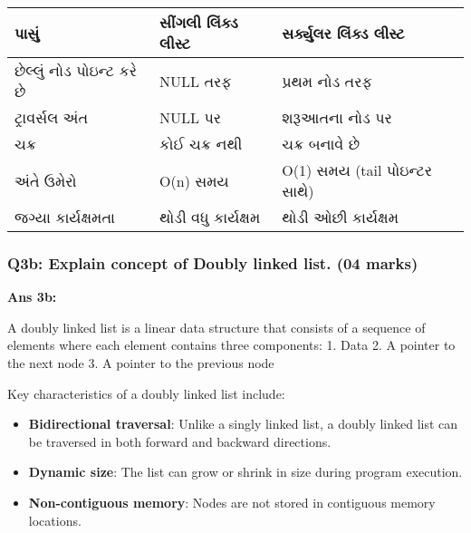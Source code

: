 \begin{longtable}[]{@{}lll@{}}
\toprule\noalign{}
પાસું & સીંગલી લિંક્ડ લીસ્ટ & સર્ક્યુલર લિંક્ડ લીસ્ટ \\
\midrule\noalign{}
\endhead
\bottomrule\noalign{}
\endlastfoot
છેલ્લું નોડ પોઇન્ટ કરે છે & NULL તરફ & પ્રથમ નોડ તરફ \\
ટ્રાવર્સલ અંત & NULL પર & શરૂઆતના નોડ પર \\
ચક્ર & કોઈ ચક્ર નથી & ચક્ર બનાવે છે \\
અંતે ઉમેરો & O(n) સમય & O(1) સમય (tail પોઇન્ટર સાથે) \\
જગ્યા કાર્યક્ષમતા & થોડી વધુ કાર્યક્ષમ & થોડી ઓછી કાર્યક્ષમ \\
\end{longtable}

\begin{Shaded}
\begin{Highlighting}[]
\end{Highlighting}
\end{Shaded}

\hypertarget{q3b-explain-concept-of-doubly-linked-list.-04-marks}{%
\subsubsection{Q3b: Explain concept of Doubly linked list. (04
marks)}\label{q3b-explain-concept-of-doubly-linked-list.-04-marks}}

\textbf{Ans 3b:}

A doubly linked list is a linear data structure that consists of a
sequence of elements where each element contains three components: 1.
Data 2. A pointer to the next node 3. A pointer to the previous node

Key characteristics of a doubly linked list include:

\begin{itemize}
\tightlist
\item
  \textbf{Bidirectional traversal}: Unlike a singly linked list, a
  doubly linked list can be traversed in both forward and backward
  directions.
\item
  \textbf{Dynamic size}: The list can grow or shrink in size during
  program execution.
\item
  \textbf{Non-contiguous memory}: Nodes are not stored in contiguous
  memory locations.
\end{itemize}


